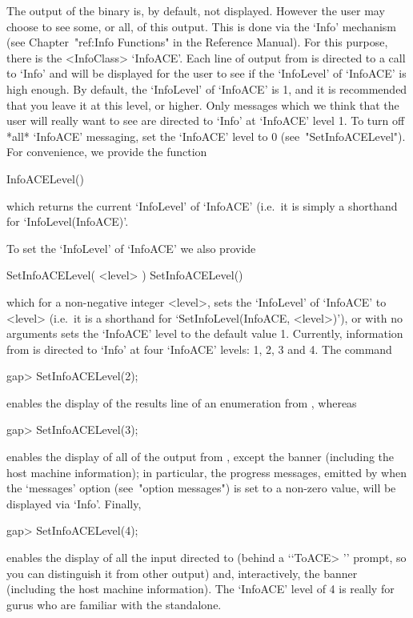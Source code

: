 
\beginitems

The output of the {\ACE} binary is, by default, not displayed. However
the user may choose to see some, or all, of this output. This is  done
via the `Info' mechanism  (see  Chapter~"ref:Info  Functions"  in  the
{\GAP} Reference Manual). For this purpose, there is  the  <InfoClass>
`InfoACE'. Each line of output from {\ACE} is directed to  a  call  to
`Info' and will be displayed for the user to see if the `InfoLevel' of
`InfoACE' is high enough. By default, the `InfoLevel' of `InfoACE'  is
1, and it is recommended that you leave it at this level,  or  higher.
Only messages which we think that the user will really want to see are
directed to `Info' at `InfoACE' level 1. To turn off  *all*  `InfoACE'
messaging, set the `InfoACE' level to 0  (see~"SetInfoACELevel").  For
convenience, we provide the function

\>InfoACELevel()

which returns the current `InfoLevel' of `InfoACE' (i.e.~it is  simply
a shorthand for `InfoLevel(InfoACE)'.

To set the `InfoLevel' of `InfoACE' we also provide

\>SetInfoACELevel( <level> )
\>SetInfoACELevel()

which for a non-negative integer  <level>,  sets  the  `InfoLevel'  of
`InfoACE'    to    <level>    (i.e.~it    is    a    shorthand     for
`SetInfoLevel(InfoACE, <level>)'),  or  with  no  arguments  sets  the
`InfoACE' level to the default value 1.  Currently,  information  from
{\ACE} is directed to `Info' at four `InfoACE' levels: 1, 2, 3 and  4.
The command

\begintt
gap> SetInfoACELevel(2);
\endtt

enables the display of the results line of an enumeration from {\ACE},
whereas

\begintt
gap> SetInfoACELevel(3);
\endtt

enables the display of all of  the  output  from  {\ACE},  except  the
{\ACE} banner (including the host machine information); in particular,
the progress messages, emitted by {\ACE} when  the  `messages'  option
(see~"option messages") is set to a non-zero value, will be  displayed
via `Info'. Finally,

\begintt
gap> SetInfoACELevel(4);
\endtt

enables the display of all the input  directed  to  {\ACE}  (behind  a
\lq{}`ToACE> '' prompt, so you can distinguish it from  other  output)
and, interactively, the {\ACE}  banner  (including  the  host  machine
information). The `InfoACE' level of 4 is really  for  gurus  who  are
familiar with the {\ACE} standalone.

